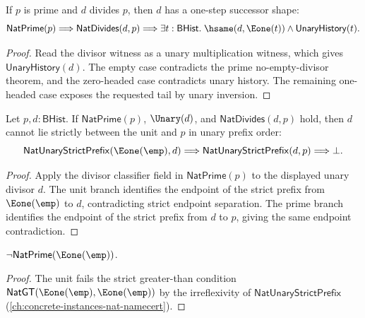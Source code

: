 \begin{theorem}
\label{thm:natprime-divisor-positive-shape}
If $p$ is prime and $d$ divides $p$, then $d$ has a one-step successor shape:
$$
\mathsf{NatPrime}(p)\Longrightarrow
\mathsf{NatDivides}(d,p)\Longrightarrow
\exists t:\mathsf{BHist}.\;
\hsame(d,\Eone(t))\wedge\mathsf{UnaryHistory}(t).
$$
\end{theorem}
\begin{proof}
Read the divisor witness as a unary multiplication witness, which gives
$\mathsf{UnaryHistory}(d)$. The empty case contradicts the prime no-empty-divisor
theorem, and the zero-headed case contradicts unary history. The remaining
one-headed case exposes the requested tail by unary inversion.
\end{proof}

\begin{theorem}
\label{thm:natprime-natdivides-strict-between-absurd}
Let $p,d:\mathsf{BHist}$. If $\mathsf{NatPrime}(p)$, $\Unary(d)$, and
$\mathsf{NatDivides}(d,p)$ hold, then $d$ cannot lie strictly between the
unit and $p$ in unary prefix order:
$$
\mathsf{NatUnaryStrictPrefix}(\Eone(\emp),d)\Longrightarrow
\mathsf{NatUnaryStrictPrefix}(d,p)\Longrightarrow\bot.
$$
\end{theorem}
\begin{proof}
Apply the divisor classifier field in $\mathsf{NatPrime}(p)$ to the displayed
unary divisor $d$. The unit branch identifies the endpoint of the strict
prefix from $\Eone(\emp)$ to $d$, contradicting strict endpoint separation.
The prime branch identifies the endpoint of the strict prefix from $d$ to
$p$, giving the same endpoint contradiction.
\end{proof}

\begin{lemma}
\label{lem:unit-not-prime}
\(\neg \mathsf{NatPrime}(\Eone(\emp))\).
\end{lemma}
\begin{proof}
The unit fails the strict greater-than condition \(\mathsf{NatGT}(\Eone(\emp), \Eone(\emp))\) by the irreflexivity of \(\mathsf{NatUnaryStrictPrefix}\) (\autoref{ch:concrete-instances-nat-namecert}).
\end{proof}

